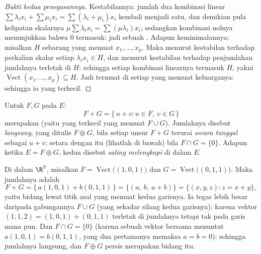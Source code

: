\begin{proof}[Bukti kedua penegasannya]
Kestabilannya: jumlah dua kombinasi linear $\sum\lambda_i x_i +
\sum\mu_i x_i = \sum(\lambda_i + \mu_i)x_i$ kembali menjadi satu, dan demikian
pula kelipatan skalarnya $\mu\sum\lambda_i x_i = \sum(\mu\lambda_i)
x_i$; sedangkan kombinasi nolnya menunjukkan bahwa $0$ termasuk: jadi  sebuah
. Adapun keminimalannya: misalkan $H$ sebarang  yang memuat $x_1,
\dots, x_p$. Maka menurut kestabilan terhadap perkalian skalar setiap
$\lambda_i x_i \in H$, dan menurut kestabilan terhadap penjumlahan jumlahnya
terletak di $H$: sehingga setiap kombinasi linearnya termasuk $H$, yakni
$\operatorname{Vect}(x_1, \dots, x_p) \subseteq H$. Jadi 
termuat di setiap  yang memuat keluarganya: sehingga ia yang
terkecil.
\end{proof}

\begin{definition}\label{def:b1:vspaces:sum}
Untuk  $F, G$ pada $E$:
\[
F + G = \{\,u + v : u \in F,\ v \in G\,\}
\]
merupakan  (yaitu yang terkecil yang memuat $F \cup G$). Jumlahnya disebut
\emph{langsung}, yang ditulis $F \oplus G$, bila setiap
unsur $F + G$ terurai \emph{secara tunggal} sebagai $u + v$;
setara dengan itu (lihatlah di bawah) bila $F \cap G = \{0\}$. Adapun ketika $E = F \oplus
G$, kedua  disebut \emph{saling melengkapi} di dalam $E$.
\end{definition}

\begin{example}
\label{ex:b1:vspaces:sumoflines}
Di dalam $\R^3$, misalkan $F = \operatorname{Vect}\bigl((1,0,1)\bigr)$ dan
$G = \operatorname{Vect}\bigl((0,1,1)\bigr)$. Maka jumlahnya adalah
\[
F + G = \{\,a(1,0,1) + b(0,1,1)\,\}
= \{(a,\ b,\ a + b)\} = \{(x, y, z) : z = x + y\},
\]
yaitu bidang lewat titik asal yang memuat kedua garisnya. Ia
tegas lebih besar daripada gabungannya $F \cup G$ (yang sekadar silang kedua
garisnya): karena vektor $(1, 1, 2) = (1,0,1) + (0,1,1)$ terletak di
jumlahnya tetapi tak pada garis mana pun. Dan $F \cap G = \{0\}$ (karena sebuah vektor
bersama menuntut $a(1,0,1) = b(0,1,1)$, yang dua 
pertamanya memaksa $a = b = 0$): sehingga jumlahnya langsung, dan $F \oplus
G$ persis merupakan bidang itu.
\end{example}

